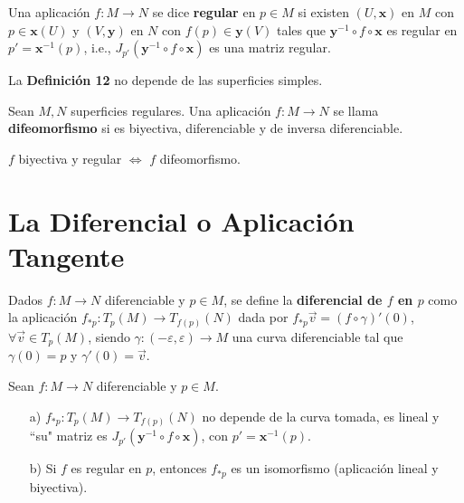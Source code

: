 \documentclass[twoside]{report}
\begin{document}
\begin{defi}
Una aplicación $f: M\rightarrow N$ se dice \textbf{regular} en $p\in M$ si existen $(U,\textbf{x})$ en $M$ con $p \in \textbf{x}(U)$ y $(V,\textbf{y})$ en $N$ con $f(p) \in \textbf{y}(V)$ tales que $\textbf{y}^{-1}\circ f \circ \textbf{x}$ es regular en $p' = \textbf{x}^{-1}(p)$, i.e., $J_{p'}(\textbf{y}^{-1}\circ f \circ \textbf{x})$ es una matriz regular.
\end{defi}

\begin{nota}
La \textup{\textbf{Definición 12}} no depende de las superficies simples.
\end{nota}

\begin{defi}
Sean $M,N$ superficies regulares. Una aplicación $f:M\to N$ se llama \textbf{difeomorfismo} si es biyectiva, diferenciable y de inversa diferenciable.
\end{defi}

\begin{nota}
$f$ biyectiva y regular $\Leftrightarrow$ $f$ difeomorfismo.
\end{nota}

\section{La Diferencial o Aplicación Tangente}

\begin{defi}
Dados $f:M \to N$ diferenciable y $p\in M$, se define la \textbf{diferencial de $f$ en $p$} como la aplicación $f_{*p}: T_p (M)\rightarrow T_{f(p)}(N)$ dada por $f_{*p}\overrightarrow{v}=(f\circ\gamma)'(0)$, $\forall \overrightarrow{v}\in T_p(M)$, siendo $\gamma:(-\varepsilon,\varepsilon)\to M$ una curva diferenciable tal que $\gamma(0)=p$ y $\gamma'(0)=\overrightarrow{v}$.
\end{defi}


\begin{teorema}
Sean $f:M\rightarrow N$ diferenciable y $p\in M$.
\begin{itemize}

\item [a)]
$f_{*p}: T_p (M)\rightarrow T_{f(p)}(N)$ no depende de la curva tomada, es lineal y ``su" matriz es $J_{p'}(\textbf{y}^{-1}\circ f \circ \textbf{x})$, con $p'= \textbf{x}^{-1}(p)$.
\item [b)]
Si $f$ es regular en $p$, entonces $f_{*p}$ es un isomorfismo (aplicación lineal y biyectiva).
\end{itemize}
\end{teorema}
\end{document}
